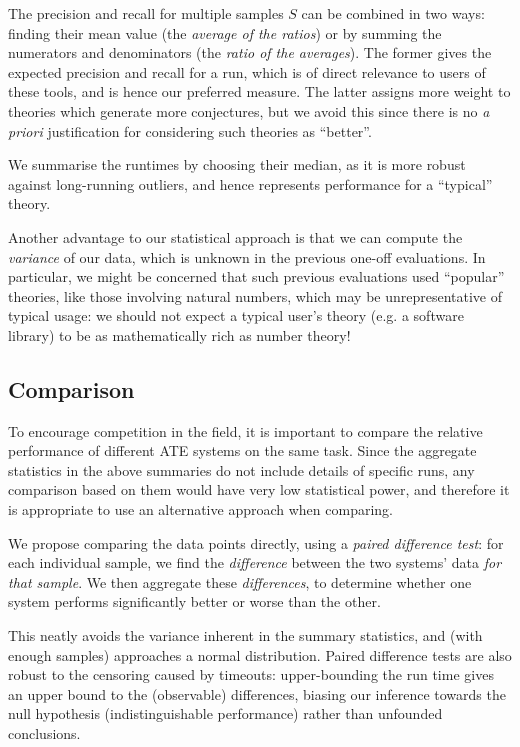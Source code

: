 The precision and recall for multiple samples $S$ can be combined in two ways:
finding their mean value (the \emph{average of the ratios}) or by summing the
numerators and denominators (the \emph{ratio of the averages}). The former gives
the expected precision and recall for a run, which is of direct relevance to
users of these tools, and is hence our preferred measure. The latter assigns
more weight to theories which generate more conjectures, but we avoid this since
there is no \emph{a priori} justification for considering such theories as
``better''.

We summarise the runtimes by choosing their median, as it is more robust against
long-running outliers, and hence represents performance for a ``typical''
theory.

Another advantage to our statistical approach is that we can compute the
\emph{variance} of our data, which is unknown in the previous one-off
evaluations. In particular, we might be concerned that such previous evaluations
used ``popular'' theories, like those involving natural numbers, which may be
unrepresentative of typical usage: we should not expect a typical user's theory
(e.g. a software library) to be as mathematically rich as number theory!

\subsection{Comparison}

To encourage competition in the field, it is important to compare the relative
performance of different ATE systems on the same task. Since the aggregate
statistics in the above summaries do not include details of specific runs, any
comparison based on them would have very low statistical power, and therefore it
is appropriate to use an alternative approach when comparing.

We propose comparing the data points directly, using a \emph{paired difference
  test}: for each individual sample, we find the \emph{difference} between the
two systems' data \emph{for that sample}. We then aggregate these
\emph{differences}, to determine whether one system performs significantly
better or worse than the other.

This neatly avoids the variance inherent in the summary statistics, and (with
enough samples) approaches a normal distribution. Paired difference tests are
also robust to the censoring caused by timeouts: upper-bounding the run time
gives an upper bound to the (observable) differences, biasing our inference
towards the null hypothesis (indistinguishable performance) rather than
unfounded conclusions.

